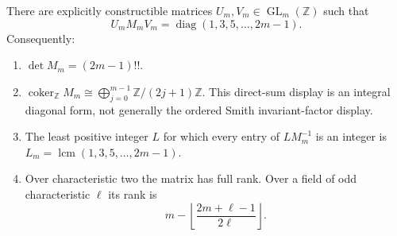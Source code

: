 \begin{theorem}
\label{oi:thm:integral}
There are explicitly constructible matrices $U_m,V_m\in
\operatorname{GL}_m(\mathbb Z)$ such that
\begin{equation}\label{oi:eq:diagonal}
 U_mM_mV_m=\operatorname{diag}(1,3,5,\ldots,2m-1).
\end{equation}
Consequently:
\begin{enumerate}
 \item $\det M_m=(2m-1)!!$.
 \item $\operatorname{coker}_{\mathbb Z}M_m\cong
       \bigoplus_{j=0}^{m-1}\mathbb Z/(2j+1)\mathbb Z$.
       This direct-sum display is an integral diagonal form, not generally
       the ordered Smith invariant-factor display.
 \item The least positive integer $L$ for which every entry of
       $LM_m^{-1}$ is an integer is
       $L_m=\operatorname{lcm}(1,3,5,\ldots,2m-1)$.
 \item Over characteristic two the matrix has full rank.  Over a field
       of odd characteristic $\ell$ its rank is
       \[
       m-\left\lfloor\frac{2m+\ell-1}{2\ell}\right\rfloor.
       \]
\end{enumerate}
\end{theorem}

